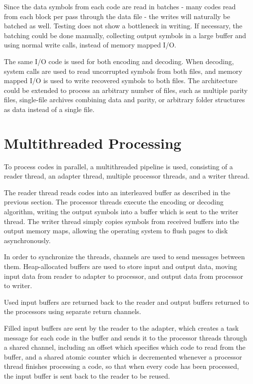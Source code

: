 Since the data symbols from each code are read in batches - many codes read from each block per pass through the data file - the writes will naturally be batched as well.
Testing does not show a bottleneck in writing.
If necessary, the batching could be done manually, collecting output symbols in a large buffer and using normal write calls, instead of memory mapped I/O.

The same I/O code is used for both encoding and decoding.
When decoding, system calls are used to read uncorrupted symbols from both files, and memory mapped I/O is used to write recovered symbols to both files.
The architecture could be extended to process an arbitrary number of files, such as multiple parity files, single-file archives combining data and parity, or arbitrary folder structures as data instead of a single file.

\section{Multithreaded Processing}

To process codes in parallel, a multithreaded pipeline is used, consisting of a reader thread, an adapter thread, multiple processor threads, and a writer thread.

The reader thread reads codes into an interleaved buffer as described in the previous section.
The processor threads execute the encoding or decoding algorithm, writing the output symbols into a buffer which is sent to the writer thread.
The writer thread simply copies symbols from received buffers into the output memory maps, allowing the operating system to flush pages to disk asynchronously.

In order to synchronize the threads, channels are used to send messages between them. Heap-allocated buffers are used to store input and output data, moving input data from reader to adapter to processor, and output data from processor to writer.

Used input buffers are returned back to the reader and output buffers returned to the processors using separate return channels.

Filled input buffers are sent by the reader to the adapter, which creates a task message for each code in the buffer and sends it to the processor threads through a shared channel, including an offset which specifies which code to read from the buffer,
and a shared atomic counter which is decremented whenever a processor thread finishes processing a code, so that when every code has been processed, the input buffer is sent back to the reader to be reused.

